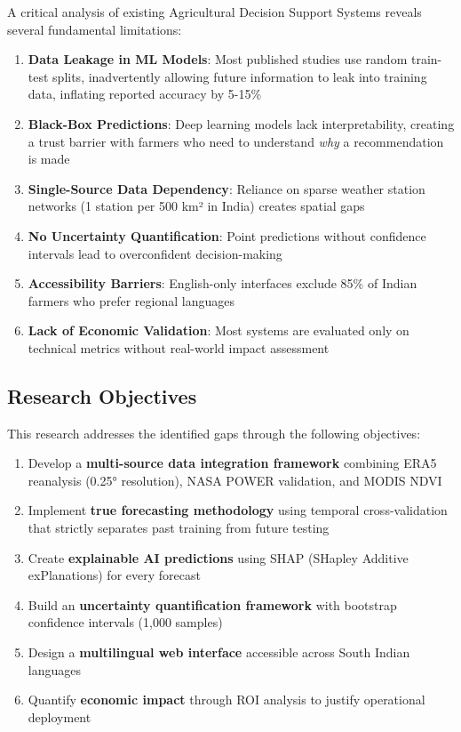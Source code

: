 \documentclass[journal,10pt,twoside]{IEEEtran}
\begin{document}
A critical analysis of existing Agricultural Decision Support Systems reveals several fundamental limitations:

\begin{enumerate}
    \item \textbf{Data Leakage in ML Models}: Most published studies use random train-test splits, inadvertently allowing future information to leak into training data, inflating reported accuracy by 5-15\%
    \item \textbf{Black-Box Predictions}: Deep learning models lack interpretability, creating a trust barrier with farmers who need to understand \textit{why} a recommendation is made
    \item \textbf{Single-Source Data Dependency}: Reliance on sparse weather station networks (1 station per 500 km² in India) creates spatial gaps
    \item \textbf{No Uncertainty Quantification}: Point predictions without confidence intervals lead to overconfident decision-making
    \item \textbf{Accessibility Barriers}: English-only interfaces exclude 85\% of Indian farmers who prefer regional languages
    \item \textbf{Lack of Economic Validation}: Most systems are evaluated only on technical metrics without real-world impact assessment
\end{enumerate}

\subsection{Research Objectives}

This research addresses the identified gaps through the following objectives:

\begin{enumerate}
    \item Develop a \textbf{multi-source data integration framework} combining ERA5 reanalysis (0.25° resolution), NASA POWER validation, and MODIS NDVI
    \item Implement \textbf{true forecasting methodology} using temporal cross-validation that strictly separates past training from future testing
    \item Create \textbf{explainable AI predictions} using SHAP (SHapley Additive exPlanations) for every forecast
    \item Build an \textbf{uncertainty quantification framework} with bootstrap confidence intervals (1,000 samples)
    \item Design a \textbf{multilingual web interface} accessible across South Indian languages
    \item Quantify \textbf{economic impact} through ROI analysis to justify operational deployment
\end{enumerate}
\end{document}
